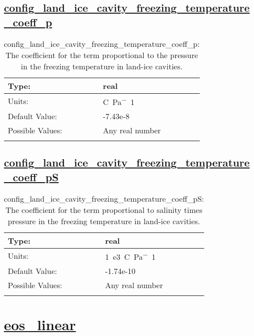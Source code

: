 \subsection[config\_land\_ice\_cavity\_freezing\_temperature\_coeff\_p]{\hyperref[sec:nm_tab_eos]{config\_land\_ice\_cavity\_freezing\_temperature\_coeff\_p}}
\label{subsec:nm_sec_config_land_ice_cavity_freezing_temperature_coeff_p}
\begin{center}
\begin{longtable}{| p{2.0in} || p{4.0in} |}
    \hline
    Type: & real \\
    \hline
    Units: & \si{C.Pa^-1} \\
    \hline
    Default Value: & -7.43e-8 \\
    \hline
    Possible Values: & Any real number \\
    \hline
    \caption{config\_land\_ice\_cavity\_freezing\_temperature\_coeff\_p: The coefficient for the term proportional to the pressure in the freezing temperature in land-ice cavities.}
\end{longtable}
\end{center}
\subsection[config\_land\_ice\_cavity\_freezing\_temperature\_coeff\_pS]{\hyperref[sec:nm_tab_eos]{config\_land\_ice\_cavity\_freezing\_temperature\_coeff\_pS}}
\label{subsec:nm_sec_config_land_ice_cavity_freezing_temperature_coeff_pS}
\begin{center}
\begin{longtable}{| p{2.0in} || p{4.0in} |}
    \hline
    Type: & real \\
    \hline
    Units: & \si{1.e3.C.Pa^-1} \\
    \hline
    Default Value: & -1.74e-10 \\
    \hline
    Possible Values: & Any real number \\
    \hline
    \caption{config\_land\_ice\_cavity\_freezing\_temperature\_coeff\_pS: The coefficient for the term proportional to salinity times pressure in the freezing temperature in land-ice cavities.}
\end{longtable}
\end{center}
\section[eos\_linear]{\hyperref[sec:nm_tab_eos_linear]{eos\_linear}}
\label{sec:nm_sec_eos_linear}
